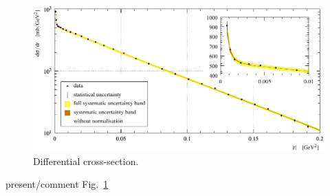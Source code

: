\begin{figure}
\begin{center}
\includegraphics[width=18cm]{fig/t_dist_tabulation.pdf}
\vskip-3mm
\caption{Differential cross-section.  }
\label{fig:dsdt}
\end{center}
\end{figure}

\> present/comment Fig.~\ref{fig:dsdt}


